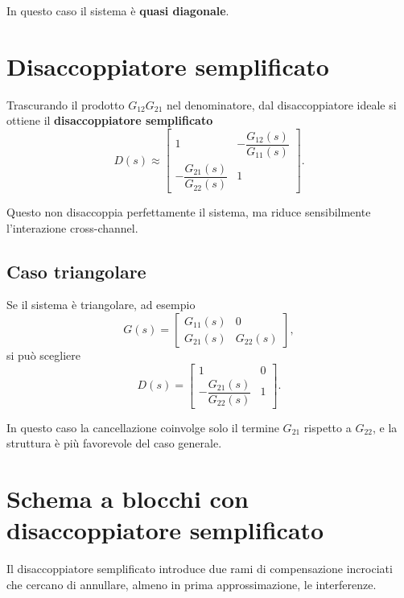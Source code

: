 In questo caso il sistema è \textbf{quasi diagonale}.

\section{Disaccoppiatore semplificato}

Trascurando il prodotto \(G_{12}G_{21}\) nel denominatore, dal disaccoppiatore ideale si ottiene il \textbf{disaccoppiatore semplificato}
\[
\boxed{
D(s)\approx
\begin{bmatrix}
1 & -\dfrac{G_{12}(s)}{G_{11}(s)}\\[0.8em]
-\dfrac{G_{21}(s)}{G_{22}(s)} & 1
\end{bmatrix}.
}
\]

Questo non disaccoppia perfettamente il sistema, ma riduce sensibilmente l'interazione cross-channel.

\subsection{Caso triangolare}

Se il sistema è triangolare, ad esempio
\[
G(s)=
\begin{bmatrix}
G_{11}(s) & 0\\
G_{21}(s) & G_{22}(s)
\end{bmatrix},
\]
si può scegliere
\[
D(s)=
\begin{bmatrix}
1 & 0\\[0.4em]
-\dfrac{G_{21}(s)}{G_{22}(s)} & 1
\end{bmatrix}.
\]

In questo caso la cancellazione coinvolge solo il termine \(G_{21}\) rispetto a \(G_{22}\), e la struttura è più favorevole del caso generale.

\section{Schema a blocchi con disaccoppiatore semplificato}

Il disaccoppiatore semplificato introduce due rami di compensazione incrociati che cercano di annullare, almeno in prima approssimazione, le interferenze.

